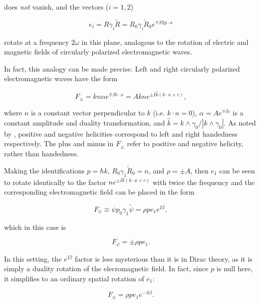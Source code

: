 \documentclass{article}
\begin{document}
  does \emph{not} vanish, and the vectors ($i = 1, 2$)

  \begin{equation}
    e_i = R \gamma_i \widetilde R = R_0 \gamma_i \widetilde R_0 e^{\mp S 2 p \cdot x}
  \end{equation} 

  rotate at a frequency $2 \omega$ in this plane, analogous to the rotation of electric and magnetic fields of circularly polarized electromagnetic waves.

  In fact, this analogy can be made precise. Left and right circularly polarized electromagnetic waves have the form\cite{gap}

    \begin{equation}
      F_\pm = k n \alpha e^{\mp I k \cdot x} = A k n e^{\pm I \hat k (k \cdot x + c)},\label{eq:emwaves}
    \end{equation}

    where $n$ is a constant vector perpendicular to $k$ (i.e. $k \cdot n= 0$), $\alpha = A e^{\mp I c}$ is a constant amplitude and duality transformation, and $\hat k = k \wedge \gamma_0 / |k \wedge \gamma_0|$. As noted by \cite{gap}, positive and negative helicities correspond to left and right handedness respectively. The plus and minus in $F_\pm$ refer to positive and negative helicity, rather than handedness.

    Making the identifications $p = \hbar k$, $R_0 \gamma_1 \widetilde R_0 = n$, and $\rho = \pm A$, then $e_1$ can be seen to rotate identically to the factor $n e^{\pm I \hat k (k \cdot x + c)}$ with twice the frequency and the corresponding electromagnetic field can be placed in the form

    \begin{equation}
      F_\psi \equiv \psi p_0 \gamma_1 \widetilde \psi = \rho p e_1 e^{I \beta}, \label{eq:emfield}
    \end{equation}

    which in this case is

    \begin{equation}
      F_\psi = \pm \rho p e_1.
    \end{equation}

    In this setting, the $e^{I \beta}$ factor is less mysterious than it is in Dirac theory, as it is simply a duality rotation of the elecromagnetic field. In fact, since $p$ is null here, it simplifies to an ordinary spatial rotation of $e_1$:

    \begin{equation}
      F_\psi = \rho p e_1 e^{-S \beta}.
    \end{equation}
\end{document}
